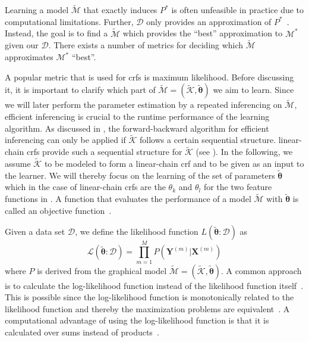 \bigskip

Learning a model $\mathcal{\tilde{M}}$ that exactly induces $P^*$ is often unfeasible in practice due to computational limitations.
Further, $\mathcal{D}$ only provides an approximation of $P^*$~\citep{koller2009probabilistic}.
Instead, the goal is to find a $\mathcal{\tilde{M}}$ which provides the ``best'' approximation to $\mathcal{M}^*$ given our $\mathcal{D}$.
There exists a number of metrics for deciding which $\mathcal{\tilde{M}}$ approximates $\mathcal{M}^*$ ``best''.

A popular metric that is used for \glspl{crf} is \gls{maximum likelihood}.
Before discussing it, it is important to clarify which part of $\mathcal{\tilde{M}}=(\mathcal{\tilde{K}},\bm{\tilde{\theta}})$ we aim to learn.
Since we will later perform the parameter estimation by a repeated inferencing on $\mathcal{\tilde{M}}$, efficient inferencing is crucial to the runtime performance of the learning algorithm.
As discussed in , the \gls{forward-backward algorithm} for efficient inferencing can only be applied if $\mathcal{\tilde{K}}$ follows a certain sequential structure.
\Glspl{linear-chain crf} provide such a sequential structure for $\mathcal{\tilde{K}}$ (see ).
In the following, we assume $\mathcal{\tilde{K}}$ to be modeled to form a \gls{linear-chain crf} and to be given as an input to the learner.
We will thereby focus on the learning of the set of parameters $\bm{\tilde{\theta}}$ which in the case of \glspl{linear-chain crf} are the $\theta_k$ and $\theta_l$ for the two \glspl{feature function} in .
A function that evaluates the performance of a model $\mathcal{\tilde{M}}$ with $\bm{\tilde{\theta}}$ is called an \gls{objective function}~\citep{koller2009probabilistic}.

\bigskip
Given a data set $\mathcal{D}$, we define the \gls{likelihood function} $L(\bm{\tilde{\theta}}:\mathcal{D})$ as
\begin{equation}
  \label{equ:likelihood}
  \mathcal{L}\left(\bm{\tilde{\theta}}:\mathcal{D}\right)=\prod_{m=1}^M P\left(\mathbf{Y}^{(m)}|\mathbf{X}^{(m)}\right)
\end{equation}
where $P$ is derived from the graphical model $\mathcal{\tilde{M}}=(\mathcal{\tilde{K}},\bm{\tilde{\theta}})$.
A common approach is to calculate the \gls{log-likelihood function} instead of the \gls{likelihood function} itself~\citep{koller2009probabilistic,sutton2010introduction,mann2010generalized}.
This is possible since the \gls{log-likelihood function} is monotonically related to the \gls{likelihood function} and thereby the maximization problems are equivalent~\citep{koller2009probabilistic}.
A computational advantage of using the \gls{log-likelihood function} is that it is calculated over sums instead of products~\citep{koller2009probabilistic}.

